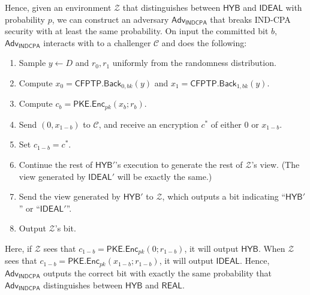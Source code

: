 \documentclass{article}[12pt]
\newcommand{\PKE}{\mathsf{PKE}}
\newcommand{\Enc}{\mathsf{Enc}}
\newcommand{\Indcpa}{\mathsf{INDCPA}}
\newcommand{\IndcpaGM}{\mathcal{C}} %
\newcommand{\EncKey}{{pk}}
\newcommand{\CFPTP}{\mathsf{CFPTP}}
\newcommand{\Back}{\mathsf{Back}}
\newcommand{\BackKey}{{bk}}
\newcommand{\Domain}{D}
\newcommand{\Adversary}{{\mathsf{Adv}}} %
\newcommand{\Environment}{{\mathcal{Z}}} %
\newcommand{\IndcpaAdversary}{{\Adversary_\Indcpa}}
\newcommand{\Ideal}{{\mathsf{IDEAL}}}
\newcommand{\Hyb}{{\mathsf{HYB}}}
\newcommand{\Real}{{\mathsf{REAL}}}
\begin{document}
Hence, given an environment $\Environment$ that distinguishes between $\Hyb$ and $\Ideal$ with probability $p$, we can construct an adversary $\IndcpaAdversary$ that breaks IND-CPA security with at least the same probability. On input the committed bit $b$, $\IndcpaAdversary$ interacts with to a challenger $\IndcpaGM$ and does the following:
\begin{enumerate}
	\item Sample $y \gets \Domain$ and $r_0, r_1$ uniformly from the randomness distribution.
	\item Compute $x_0 = \CFPTP.\Back_{0, \BackKey}(y)$ and $x_1 = \CFPTP.\Back_{1, \BackKey}(y)$.
	\item Compute $c_b = \PKE.\Enc_{\EncKey}(x_b; r_b)$.
	\item Send $(0, x_{1-b})$ to $\IndcpaGM$, and receive an encryption $c^*$ of either $0$ or $x_{1-b}$.
	\item Set $c_{1-b} = c^*$.
	\item Continue the rest of $\Hyb'$'s execution to generate the rest of $\Environment$'s view. (The view generated by $\Ideal'$ will be exactly the same.)
	\item Send the view generated by $\Hyb'$ to $\Environment$, which outputs a bit indicating ``$\Hyb'$'' or ``$\Ideal'$''.
	\item Output $\Environment$'s bit.
\end{enumerate}

Here, if $\Environment$ sees that $c_{1-b} = \PKE.\Enc_\EncKey(0; r_{1-b})$, it will output $\Hyb$. When $\Environment$ sees that $c_{1-b} = \PKE.\Enc_\EncKey(x_{1-b}; r_{1-b})$, it will output $\Ideal$. Hence, $\IndcpaAdversary$ outputs the correct bit with exactly the same probability that $\IndcpaAdversary$ distinguishes between $\Hyb$ and $\Real$.
\end{document}
